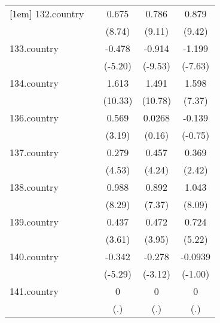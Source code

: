 {\begin{tabular}{l*{4}{c}}
[1em]
132.country &                     &       0.675\sym{***}&       0.786\sym{***}&       0.879\sym{***}\\
            &                     &      (8.74)         &      (9.11)         &      (9.42)         \\
[1em]
133.country &                     &      -0.478\sym{***}&      -0.914\sym{***}&      -1.199\sym{***}\\
            &                     &     (-5.20)         &     (-9.53)         &     (-7.63)         \\
[1em]
134.country &                     &       1.613\sym{***}&       1.491\sym{***}&       1.598\sym{***}\\
            &                     &     (10.33)         &     (10.78)         &      (7.37)         \\
[1em]
136.country &                     &       0.569\sym{**} &      0.0268         &      -0.139         \\
            &                     &      (3.19)         &      (0.16)         &     (-0.75)         \\
[1em]
137.country &                     &       0.279\sym{***}&       0.457\sym{***}&       0.369\sym{*}  \\
            &                     &      (4.53)         &      (4.24)         &      (2.42)         \\
[1em]
138.country &                     &       0.988\sym{***}&       0.892\sym{***}&       1.043\sym{***}\\
            &                     &      (8.29)         &      (7.37)         &      (8.09)         \\
[1em]
139.country &                     &       0.437\sym{***}&       0.472\sym{***}&       0.724\sym{***}\\
            &                     &      (3.61)         &      (3.95)         &      (5.22)         \\
[1em]
140.country &                     &      -0.342\sym{***}&      -0.278\sym{**} &     -0.0939         \\
            &                     &     (-5.29)         &     (-3.12)         &     (-1.00)         \\
[1em]
141.country &                     &           0         &           0         &           0         \\
            &                     &         (.)         &         (.)         &         (.)         \\

\end{tabular}}

